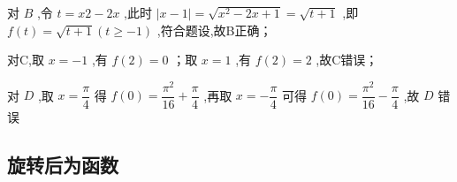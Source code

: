 \begin{enumerate}
\begin{jieda}
        对 ${B}$ ,令 $t = {x2} - {2x}$ ,此时 $\left| {x - 1}\right|  = \sqrt{{x}^{2} - {2x} + 1} = \sqrt{t + 1}$ ,即 $f\left( t\right)  = \sqrt{t + 1}\left( {t \geq   - 1}\right)$ ,符合题设,故B正确；
        
        对C,取 $x =  - 1$ ,有 $f\left( 2\right)  = 0$ ；取 $x = 1$ ,有 $f\left( 2\right)  = 2$ ,故C错误；
        
        对 $D$ ,取 $x = \dfrac{\pi }{4}$ 得 $f\left( 0\right)  = \dfrac{{\pi }^{2}}{16} + \dfrac{\pi }{4}$ ,再取 $x =  - \dfrac{\pi }{4}$ 可得 $f\left( 0\right)  = \dfrac{{\pi }^{2}}{16} - \dfrac{\pi }{4}$ ,故 $D$ 错误
    \end{jieda}
\end{enumerate}
\subsection*{旋转后为函数}
